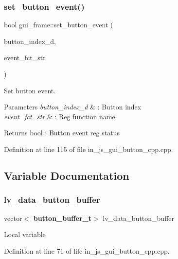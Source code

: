 \subsubsection{set\_button\_event()}
{\footnotesize\ttfamily bool gui\+\_\+frame\+::set\+\_\+button\+\_\+event (\begin{DoxyParamCaption}\item[{double}]{button\+\_\+index\+\_\+d,  }\item[{wx\+String}]{event\+\_\+fct\+\_\+str }\end{DoxyParamCaption})}



Set button event. 


\begin{DoxyParams}{Parameters}
{\em button\+\_\+index\+\_\+d} & \+: Button index \\
\hline
{\em event\+\_\+fct\+\_\+str} & \+: Reg function name \\
\hline
\end{DoxyParams}
\begin{DoxyReturn}{Returns}
bool \+: Button event reg status 
\end{DoxyReturn}


Definition at line 115 of file in\+\_\+js\+\_\+gui\+\_\+button\+\_\+cpp.\+cpp.



\subsection{Variable Documentation}
\mbox{\label{group___button_ga72f70225064d049b43c0120b465cc1ec}} 
\subsubsection{lv\_data\_button\_buffer}
{\footnotesize\ttfamily vector$<$\textbf{ button\+\_\+buffer\+\_\+t}$>$ lv\+\_\+data\+\_\+button\+\_\+buffer}

Local variable 

Definition at line 71 of file in\+\_\+js\+\_\+gui\+\_\+button\+\_\+cpp.\+cpp.

